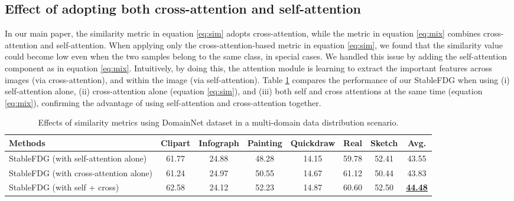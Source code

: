 \documentclass{article}
\theoremstyle{plain}
\theoremstyle{definition}
\theoremstyle{remark}
\begin{document}
\subsection{Effect of adopting both cross-attention and self-attention}
In our main paper, the similarity metric in equation \eqref{eq:sim} adopts cross-attention, while the metric in equation \eqref{eq:mix} combines cross-attention and self-attention. When applying only the cross-attention-based metric in equation \eqref{eq:sim}, we found that the similarity value could become low even when the two samples belong to the same class, in special cases. We handled this issue by adding the self-attention component as in equation  \eqref{eq:mix}. Intuitively, by doing this, the attention module is learning to extract the important features across images (via cross-attention), and within the image (via self-attention). Table \ref{table:crossself}  compares the performance of our StableFDG when using (i) self-attention alone, (ii) cross-attention alone (equation \eqref{eq:sim}),  and (iii) both self and cross attentions at the same time (equation  \eqref{eq:mix}),  confirming the advantage of using self-attention and cross-attention together. 


\begin{table}[h]
\scriptsize
\centering
	\begin{tabular}{l|    cccccc | c}
		\toprule  
		Methods   &Clipart & Infograph& Painting &Quickdraw & Real & Sketch & Avg. \\ 
		\midrule	
				StableFDG (with self-attention alone) &61.77	&24.88&	48.28	&14.15&	59.78&	52.41&	43.55 \\
				StableFDG (with cross-attention alone) &61.24& 24.97& 50.55& 14.67& 61.12 &50.44 & 43.83 \\
		StableFDG (with self + cross) & 62.58& 24.12& 52.23& 14.87 & 60.60 & 52.50 & \textbf{\underline{44.48}}  \\
		\bottomrule
	\end{tabular}
\vspace{+3mm}
\caption{Effects of similarity metrics using DomainNet dataset in a multi-domain data distribution scenario.} 
\label{table:crossself}
\end{table} 




\end{document}
